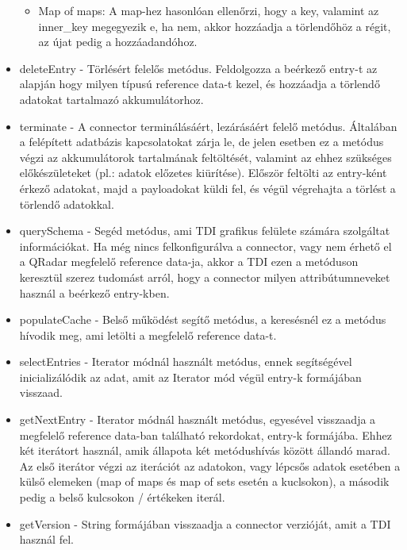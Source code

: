 \begin{itemize}
\begin{itemize}
		\item Map of maps: A map-hez hasonlóan ellenőrzi, hogy a key, valamint az inner\_key megegyezik e, ha nem, akkor hozzáadja a törlendőhöz a régit, az újat pedig a hozzáadandóhoz.
	\end{itemize}

	\item deleteEntry - Törlésért felelős metódus. Feldolgozza a beérkező entry-t az alapján hogy milyen típusú reference data-t kezel, és hozzáadja a törlendő adatokat tartalmazó akkumulátorhoz.
	
	\item terminate - A connector terminálásáért, lezárásáért felelő metódus. Általában a felépített adatbázis kapcsolatokat zárja le, de jelen esetben ez a metódus végzi az akkumulátorok tartalmának feltöltését, valamint az ehhez szükséges előkészületeket (pl.: adatok előzetes kiürítése). Először feltölti az entry-ként érkező adatokat, majd a payloadokat küldi fel, és végül végrehajta a törlést a törlendő adatokkal.
	
	\item querySchema - Segéd metódus, ami TDI grafikus felülete számára szolgáltat információkat. Ha még nincs felkonfigurálva a connector, vagy nem érhető el a QRadar megfelelő reference data-ja, akkor a TDI ezen a metóduson keresztül szerez tudomást arról, hogy a connector milyen attribútumneveket használ a beérkező entry-kben.
	
	\item populateCache - Belső működést segítő metódus, a keresésnél ez a metódus hívodik meg, ami letölti a megfelelő reference data-t.
	
	\item selectEntries - Iterator módnál használt metódus, ennek segítségével inicializálódik az adat, amit az Iterator mód végül entry-k formájában visszaad.
	
	\item getNextEntry - Iterator módnál használt metódus, egyesével visszaadja a megfelelő reference data-ban található rekordokat, entry-k formájába. Ehhez két iterátort használ, amik állapota két metódushívás között állandó marad. Az első iterátor végzi az iterációt az adatokon, vagy lépcsős adatok esetében a külső elemeken (map of maps és map of sets esetén a kuclsokon), a második pedig a belső kulcsokon / értékeken iterál.
	
	\item getVersion - String formájában visszaadja a connector verzióját, amit a TDI használ fel.
\end{itemize}

